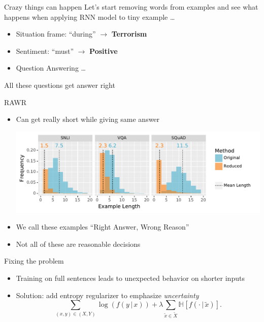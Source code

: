 \documentclass[compress]{beamer}
\newcommand{\h}[2]{\mathbb{H}_{#1}\left[ #2 \right] }
\newcommand{\g}{\, | \,}
\newcommand{\fsi}[2]{
\begin{frame}[plain]
\vspace*{-1pt}
\makebox[\linewidth]{\texttt{[image: \#1]}}
\begin{center}
#2
\end{center}
\end{frame}
}
\begin{document}
\begin{frame}{Crazy things can happen}
  Let's start removing words from examples and see what happens when
  applying RNN model to tiny example \dots
  \begin{itemize}
    \item Situation frame: ``during'' $\rightarrow$ {\bf Terrorism}
      \pause
    \item Sentiment: ``must'' $\rightarrow$ {\bf Positive}
      \pause
    \item Question Answering \dots
  \end{itemize}

  \end{frame}

\fsi{rawr/heat_map_1}{All these questions get answer right}

\begin{frame}{RAWR}
  \begin{itemize}
    \item Can get really short while giving same answer
      \begin{center}
        \includegraphics[width=.9\linewidth]{rawr/length_histogram}
      \end{center}
    \item We call these examples ``Right Answer, Wrong Reason''
    \item Not all of these are reasonable decisions
  \end{itemize}

\end{frame}

\begin{frame}{Fixing the problem}

  \begin{itemize}
    \item Training on full sentences leads to unexpected behavior on
      shorter inputs
    \item Solution: add entropy regularizer to emphasize
      \emph{uncertainty}
      \begin{equation*}
      \sum_{(x, y) \in (X, Y)}\log(f(y \g x)) + \lambda\sum_{\tilde{x}\in \tilde{X}}
       \h{}{f(\cdot \g \tilde{x})}.
    \end{equation*}
  \end{itemize}

\end{frame}
\end{document}
